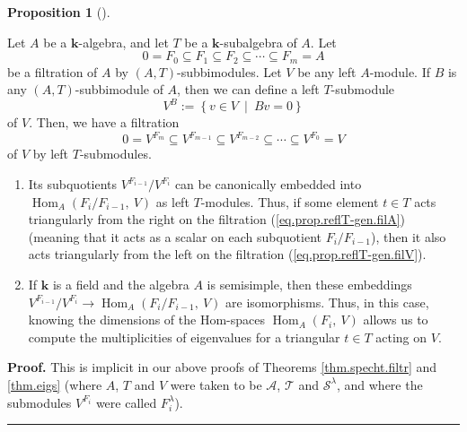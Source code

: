\documentclass[numbers=enddot,12pt,final,onecolumn,notitlepage]{scrartcl}%
\theoremstyle{definition}
\newtheorem{prop}[theo]{Proposition}
\newenvironment{proposition}[1][]
{\begin{prop}[#1]\begin{leftbar}}
{\end{leftbar}\end{prop}}
\newenvironment{proof}[1][Proof]{\noindent\textbf{#1.} }{\ \rule{0.5em}{0.5em}}
\begin{document}
\begin{proposition}
\label{prop.reflT-gen}Let $A$ be a $\mathbf{k}$-algebra\footnotemark, and let
$T$ be a $\mathbf{k}$-subalgebra of $A$. Let%
\begin{equation}
0=F_{0}\subseteq F_{1}\subseteq F_{2}\subseteq\cdots\subseteq F_{m}=A
\label{eq.prop.reflT-gen.filA}%
\end{equation}
be a filtration of $A$ by $\left(  A,T\right)  $-subbimodules. Let $V$ be any
left $A$-module. If $B$ is any $\left(  A,T\right)  $-subbimodule of $A$, then
we can define a left $T$-submodule
\[
V^{B}:=\left\{  v\in V\ \mid\ Bv=0\right\}
\]
of $V$. Then, we have a filtration%
\begin{equation}
0=V^{F_{m}}\subseteq V^{F_{m-1}}\subseteq V^{F_{m-2}}\subseteq\cdots\subseteq
V^{F_{0}}=V \label{eq.prop.reflT-gen.filV}%
\end{equation}
of $V$ by left $T$-submodules.

\begin{enumerate}
\item[\textbf{(a)}] Its subquotients $V^{F_{i-1}}/V^{F_{i}}$ can be
canonically embedded into $\operatorname*{Hom}\nolimits_{A}\left(
F_{i}/F_{i-1},\ V\right)  $ as left $T$-modules. Thus, if some element $t\in
T$ acts triangularly from the right on the filtration
(\ref{eq.prop.reflT-gen.filA}) (meaning that it acts as a scalar on each
subquotient $F_{i}/F_{i-1}$), then it also acts triangularly from the left on
the filtration (\ref{eq.prop.reflT-gen.filV}).

\item[\textbf{(b)}] If $\mathbf{k}$ is a field and the algebra $A$ is
semisimple, then these embeddings $V^{F_{i-1}}/V^{F_{i}}\rightarrow
\operatorname*{Hom}\nolimits_{A}\left(  F_{i}/F_{i-1},\ V\right)  $ are
isomorphisms. Thus, in this case, knowing the dimensions of the Hom-spaces
$\operatorname*{Hom}\nolimits_{A}\left(  F_{i},\ V\right)  $ allows us to
compute the multiplicities of eigenvalues for a triangular $t\in T$ acting on
$V$.
\end{enumerate}
\end{proposition}


\begin{proof}
This is implicit in our above proofs of Theorems \ref{thm.specht.filtr} and
\ref{thm.eigs} (where $A$, $T$ and $V$ were taken to be $\mathcal{A}$,
$\mathcal{T}$ and $\mathcal{S}^{\lambda}$, and where the submodules $V^{F_{i}%
}$ were called $F_{i}^{\lambda}$).
\end{proof}
\end{document}
